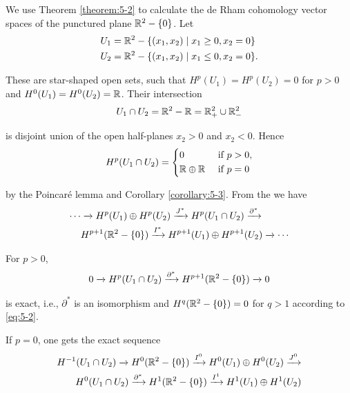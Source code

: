 \begin{example}\label{example:5-4}
  We use Theorem \ref{theorem:5-2} to calculate the de Rham cohomology vector spaces of the punctured plane ${\mathbb{R}}^2-\{0\}$. Let 
  \begin{align*}
    U_{1} & = {\mathbb{R}}^2-\{(x_1,x_2)\mid x_1\geq0, x_2=0\}\\
    U_{2} & = {\mathbb{R}}^2-\{(x_1,x_2)\mid x_1\leq0, x_2=0\}.
  \end{align*}

  These are star-shaped open sets, such that $H^p(U_1) = H^p(U_2) = 0$ for $p>0$ and $H^0(U_1) = H^0(U_2) = {\mathbb{R}}$. 
  Their intersection 
  \begin{align*}
    U_1\cap U_2 = {\mathbb{R}}^2-{\mathbb{R}} = {\mathbb{R}}^2_+\cup {\ensuremath{\mathbb{R}}}^2_-
  \end{align*}

  is disjoint union of the open half-planes $x_2>0$ and $x_2<0$. Hence 
  \begin{align}\label{eq:5-2}
    H^p(U_1\cap U_2) = \left\{\begin{aligned}
      & 0 && \text{ if } p>0,\\
      & {\mathbb{R}}\oplus{\ensuremath{\mathbb{R}}} && \text{ if } p = 0
    \end{aligned}\right.
  \end{align}

  by the Poincar\'e lemma and Corollary \ref{corollary:5-3}. From the  we have
  \begin{align*}
    \cdots  & \xra[] H^p(U_1)\oplus H^p(U_2)\xra[J^*]H^p(U_1\cap U_2)\xra[\partial^*]\\
            & H^{p+1}(\RR^2-\{0\})\xra[I^*] H^{p+1}(U_1)\oplus H^{p+1}(U_2)\xra[]\cdots
  \end{align*}
\end{example}

For $p>0$, 
\begin{align*}
  0\xra[] H^p(U_1\cap U_2)\xra[\partial^*] H^{p+1}(\RR^2-\{0\})\xra[] 0
\end{align*}

is exact, i.e., $\partial^*$ is an isomorphism and $H^q({\mathbb{R}}^2-\{0\}) = 0$ for $q>1$ according 
to \eqref{eq:5-2}.

If $p=0$, one gets the exact sequence
\begin{align}\label{eq:5-3}
\begin{aligned}
  H^{-1}(U_1\cap U_2)\xra[] H^0(\RR^2-\{0\}) \xra[I^0] H^0(U_1)\oplus H^0(U_2)\xra[J^0] \\
  H^0(U_1\cap U_2)\xra[\partial^*] H^1(\RR^2-\{0\}) \xra[I^1]H^1(U_1)\oplus H^1(U_2)
\end{aligned}
\end{align}

